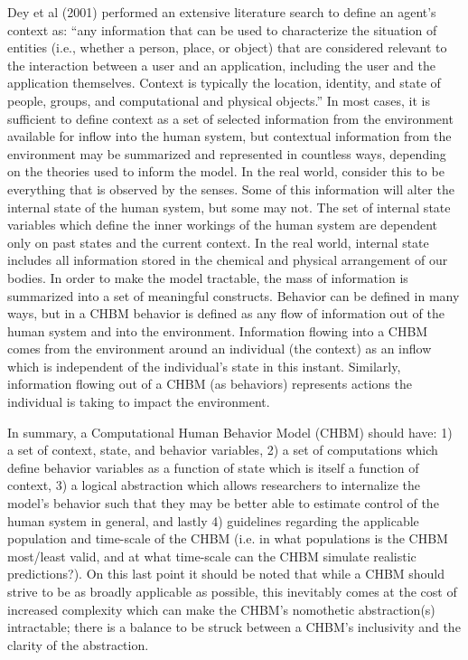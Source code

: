 \documentclass[runningheads,a4paper]{llncs}
\begin{document}
Dey et al (2001) performed an extensive literature search to define an agent’s context as: “any information that can be used to characterize the situation of entities (i.e., whether a person, place, or object) that are considered relevant to the interaction between a user and an application, including the user and the application themselves. Context is typically the location, identity, and state of people, groups, and computational and physical objects.” 
In most cases, it is sufficient to define context as a set of selected information from the environment available for inflow into the human system, but contextual information from the environment may be summarized and represented in countless ways, depending on the theories used to inform the model.
In the real world, consider this to be everything that is observed by the senses. 
Some of this information will alter the internal state of the human system, but some may not. 
The set of internal state variables which define the inner workings of the human system are dependent only on past states and the current context. 
In the real world, internal state includes all information stored in the chemical and physical  arrangement of our bodies. 
In order to make the model tractable, the mass of information is summarized into a set of meaningful constructs.
Behavior can be defined in many ways, but in a CHBM behavior is defined as any flow of information out of the human system and into the environment.
Information flowing into a CHBM comes from the environment around an individual (the context) as an inflow which is independent of the individual’s state in this instant.
Similarly, information flowing out of a CHBM (as behaviors) represents actions the individual is taking to impact the environment.

In summary, a Computational Human Behavior Model (CHBM) should have: 1) a set of context, state, and behavior variables, 2) a set of computations which define behavior variables as a function of state which is itself a function of context, 3) a logical abstraction which allows researchers to internalize the model’s behavior such that they may be better able to estimate control of the human system in general, and lastly 4) guidelines regarding the applicable population and time-scale of the CHBM (i.e. in what populations is the CHBM most/least valid, and at what time-scale can the CHBM simulate realistic predictions?). 
On this last point it should be noted that while a CHBM should strive to be as broadly applicable as possible, this inevitably comes at the cost of increased complexity which can make the CHBM’s nomothetic abstraction(s) intractable; there is a balance to be struck between a CHBM’s inclusivity and the clarity of the abstraction.
\end{document}

